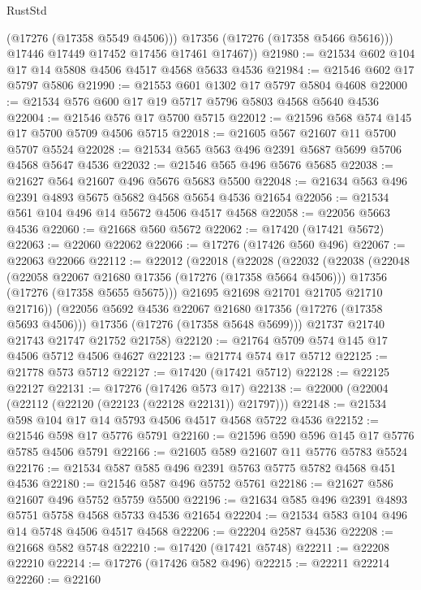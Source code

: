 \begin{lexlean}{RustStd}
\begin{coremodule}
            (@17276 (@17358 @5549 @4506)))
          @17356
          (@17276 (@17358 @5466 @5616)))
        @17446
        @17449
        @17452
        @17456
        @17461
        @17467))
@21980 := @21534 @602 @104 @17 @14 @5808 @4506 @4517 @4568 @5633 @4536
@21984 := @21546 @602 @17 @5797 @5806
@21990 := @21553 @601 @1302 @17 @5797 @5804 @4608
@22000 := @21534 @576 @600 @17 @19 @5717 @5796 @5803 @4568 @5640 @4536
@22004 := @21546 @576 @17 @5700 @5715
@22012 := @21596 @568 @574 @145 @17 @5700 @5709 @4506 @5715
@22018 := @21605 @567 @21607 @11 @5700 @5707 @5524
@22028 := @21534 @565 @563 @496 @2391 @5687 @5699 @5706 @4568 @5647 @4536
@22032 := @21546 @565 @496 @5676 @5685
@22038 := @21627 @564 @21607 @496 @5676 @5683 @5500
@22048 := @21634 @563 @496 @2391 @4893 @5675 @5682 @4568 @5654 @4536 @21654
@22056 := @21534 @561 @104 @496 @14 @5672 @4506 @4517 @4568
@22058 := @22056 @5663 @4536
@22060 := @21668 @560 @5672
@22062 := @17420 (@17421 @5672)
@22063 := @22060 @22062
@22066 := @17276 (@17426 @560 @496)
@22067 := @22063 @22066
@22112 := @22012
    (@22018
      (@22028
        (@22032
          (@22038
            (@22048
              (@22058 @22067 @21680 @17356 (@17276 (@17358 @5664 @4506)))
              @17356
              (@17276 (@17358 @5655 @5675)))
            @21695
            @21698
            @21701
            @21705
            @21710
            @21716))
        (@22056 @5692 @4536 @22067 @21680 @17356 (@17276 (@17358 @5693 @4506)))
        @17356
        (@17276 (@17358 @5648 @5699)))
      @21737
      @21740
      @21743
      @21747
      @21752
      @21758)
@22120 := @21764 @5709 @574 @145 @17 @4506 @5712 @4506 @4627
@22123 := @21774 @574 @17 @5712
@22125 := @21778 @573 @5712
@22127 := @17420 (@17421 @5712)
@22128 := @22125 @22127
@22131 := @17276 (@17426 @573 @17)
@22138 := @22000 (@22004 (@22112 (@22120 (@22123 (@22128 @22131)) @21797)))
@22148 := @21534 @598 @104 @17 @14 @5793 @4506 @4517 @4568 @5722 @4536
@22152 := @21546 @598 @17 @5776 @5791
@22160 := @21596 @590 @596 @145 @17 @5776 @5785 @4506 @5791
@22166 := @21605 @589 @21607 @11 @5776 @5783 @5524
@22176 := @21534 @587 @585 @496 @2391 @5763 @5775 @5782 @4568 @451 @4536
@22180 := @21546 @587 @496 @5752 @5761
@22186 := @21627 @586 @21607 @496 @5752 @5759 @5500
@22196 := @21634 @585 @496 @2391 @4893 @5751 @5758 @4568 @5733 @4536 @21654
@22204 := @21534 @583 @104 @496 @14 @5748 @4506 @4517 @4568
@22206 := @22204 @2587 @4536
@22208 := @21668 @582 @5748
@22210 := @17420 (@17421 @5748)
@22211 := @22208 @22210
@22214 := @17276 (@17426 @582 @496)
@22215 := @22211 @22214
@22260 := @22160

\end{coremodule}
\end{lexlean}
